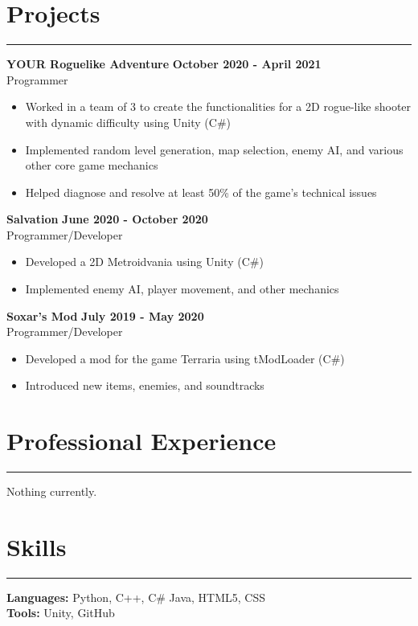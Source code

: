 \documentclass{article}
\begin{document}
\section*{Projects} \vspace{-6pt} \hrule \vspace{6pt}
\textbf{YOUR Roguelike Adventure} \hfill \textbf{October 2020 - April 2021}\\
Programmer
\begin{itemize}
	\item\vspace{-6pt} Worked in a team of 3 to create the functionalities for a 2D rogue-like shooter with dynamic difficulty using Unity (C$\#$)
	\item\vspace{-6pt} Implemented random level generation, map selection, enemy AI, and various other core game mechanics
	\item\vspace{-6pt} Helped diagnose and resolve at least 50\% of the game's technical issues
\end{itemize}
\vspace{-6pt}
\textbf{Salvation} \hfill \textbf{June 2020 - October 2020}\\
Programmer/Developer
\begin{itemize}
	\item\vspace{-6pt} Developed a 2D Metroidvania using Unity (C$\#$)
	\item\vspace{-6pt} Implemented enemy AI, player movement, and other mechanics
\end{itemize}
\vspace{-6pt}
\textbf{Soxar's Mod} \hfill \textbf{July 2019 - May 2020}\\
Programmer/Developer
\begin{itemize}
	\item\vspace{-6pt} Developed a mod for the game Terraria using tModLoader (C$\#$)
	\item\vspace{-6pt} Introduced new items, enemies, and soundtracks
\end{itemize}
\vspace{-20pt}

\section*{Professional Experience} \vspace{-6pt} \hrule \vspace{6pt}
Nothing currently.
\vspace{-10pt}

\section*{Skills} \vspace{-6pt} \hrule \vspace{6pt}
\textbf{Languages:} Python, C++, C$\#$ Java, HTML5, CSS\\
\textbf{Tools:} Unity, GitHub
\end{document}
